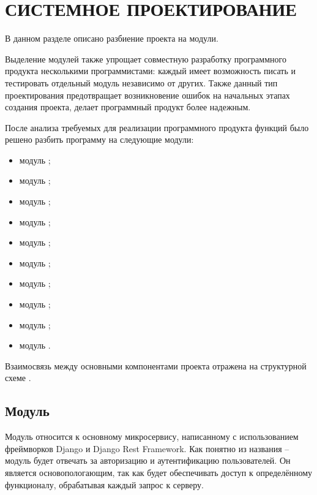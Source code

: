 \section{СИСТЕМНОЕ ПРОЕКТИРОВАНИЕ}
\label{sec:sys}


В данном разделе описано разбиение проекта на модули.

Выделение модулей также упрощает совместную разработку программного продукта несколькими программистами: каждый имеет возможность писать и тестировать отдельный модуль независимо от других.
Также данный тип проектирования предотвращает возникновение ошибок на начальных этапах создания проекта, делает программный продукт более надежным.

После анализа требуемых для реализации программного продукта функций было решено разбить программу на следующие модули:

\begin{itemize}
    \item модуль \moduleAuth;
    \item модуль \moduleStripe;
    \item модуль \moduleTrading;
    \item модуль \moduleAutoTrading;
    \item модуль \moduleNotifications;
    \item модуль \moduleCommunicationPostgres;
    \item модуль \moduleCommunication;
    \item модуль \moduleParsing;
    \item модуль \moduleStatistics;
    \item модуль \moduleCommunicationMongoDB.
\end{itemize}

Взаимосвязь между основными компонентами проекта отражена на структурной схеме
\structScheme.

\subsection{Модуль \moduleAuth}\label{subsec:sys:module-auth}
Модуль \moduleAuth относится к основному микросервису, написанному с использованием фреймворков Django и Django Rest Framework.
Как понятно из названия -- модуль \moduleAuth будет отвечать за авторизацию и аутентификацию пользователей.
Он является основопологающим, так как будет обеспечивать доступ к определённому функционалу, обрабатывая каждый запрос к серверу.

